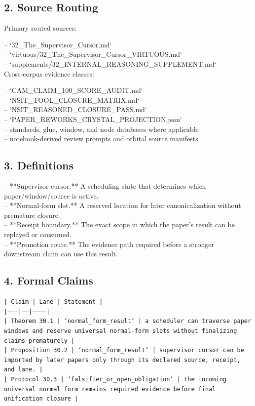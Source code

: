 \documentclass[11pt]{article}
\begin{document}
\subsection*{2. Source Routing}

Primary routed sources:

\noindent{}-- `32\_The\_Supervisor\_Cursor.md`\\
\noindent{}-- `virtuous/32\_The\_Supervisor\_Cursor\_VIRTUOUS.md`\\
\noindent{}-- `supplements/32\_INTERNAL\_REASONING\_SUPPLEMENT.md`\\

Cross-corpus evidence classes:

\noindent{}-- `CAM\_CLAIM\_100\_SCORE\_AUDIT.md`\\
\noindent{}-- `NSIT\_TOOL\_CLOSURE\_MATRIX.md`\\
\noindent{}-- `NSIT\_REASONED\_CLOSURE\_PASS.md`\\
\noindent{}-- `PAPER\_REWORKS\_CRYSTAL\_PROJECTION.json`\\
\noindent{}-- standards, glue, window, and node databases where applicable\\
\noindent{}-- notebook-derived review prompts and orbital source manifests\\

\subsection*{3. Definitions}

\noindent{}-- **Supervisor cursor.** A scheduling state that determines which paper/window/source is active.\\
\noindent{}-- **Normal-form slot.** A reserved location for later canonicalization without premature closure.\\
\noindent{}-- **Receipt boundary.** The exact scope in which the paper's result can be replayed or consumed.\\
\noindent{}-- **Promotion route.** The evidence path required before a stronger downstream claim can use this result.\\

\subsection*{4. Formal Claims}

\noindent\texttt{| Claim | Lane | Statement |}\\
\noindent\texttt{|-------|------|-----------|}\\
\noindent\texttt{| Theorem 30.1 | `normal\_form\_result` | a scheduler can traverse paper windows and reserve universal normal-form slots without finalizing claims prematurely |}\\
\noindent\texttt{| Proposition 30.2 | `normal\_form\_result` | supervisor cursor can be imported by later papers only through its declared source, receipt, and lane. |}\\
\noindent\texttt{| Protocol 30.3 | `falsifier\_or\_open\_obligation` | the incoming universal normal form remains required evidence before final unification closure |}\\
\end{document}

